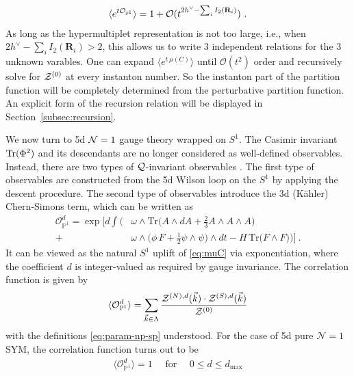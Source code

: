\documentclass[letterpaper, 11pt]{article}
\def\IP{\mathbb{P}}
\def\CN{{\cal N}}
\def\CO{{\cal O}}
\def\CQ{{\cal Q}}
\def\CZ{{\cal Z}}
\def\Tr{{\rm Tr}}
\begin{document}
\begin{align}
  \label{eq:donaldson-4d}
  \langle e^{t {\CO}_{\IP^1}}\rangle = 1 + \CO(t^{2h^\vee - \sum_i I_2(\mathbf{R}_i)})  \ . 
\end{align}
As long as the hypermultiplet representation is not too large, i.e., when $2h^\vee - \sum_i I_2(\mathbf{R}_i) > 2$, this allows us to write 3 independent relations for the 3 unknown varables. One can expand $\langle e^{t \, \mu(C)}\rangle$ until $\mathcal{O}(t^2)$ order and recursively solve for $\CZ^{(0)}$ at every instanton number. So the instanton part of the partition function will be completely determined from the perturbative partition function. An explicit form of the recursion relation will be displayed in Section~\ref{subsec:recursion}.

We now turn to 5d $\CN=1$ gauge theory wrapped on $S^1$. The Casimir invariant $\Tr (\Phi^2)$ and its descendants are no longer considered as well-defined observables. Instead, there are two types of $\CQ$-invariant observables \cite{Baulieu:1997nj}. The first type of observables are constructed from the 5d Wilson loop on the $S^1$ by applying the descent procedure. The second type of observables introduce the 3d (K\"ahler) Chern-Simons term, which can be written as \cite{Losev:1995cr,Baulieu:1997nj}
\begin{align} 
  \mathcal{O}_{\IP^1}^{d} = \exp\bigg[
    d\int \bigg( & \omega \wedge \text{Tr}\Big(A \wedge dA + \frac{2}{3}A\wedge A \wedge A \Big) \\ \nonumber
     + &\omega \wedge \Big( \phi \, F + \frac{1}{2}\psi \wedge \psi \Big)\wedge dt -H\, \text{Tr}\Big( F \wedge F \Big) \bigg)
     \bigg] \ .
\end{align}
It can be viewed as the natural $S^1$ uplift of \eqref{eq:muC} via exponentiation, where the coefficient $d$ is integer-valued as required by gauge invariance. The correlation function is given by
\begin{align}
  \label{eq:cor5d}
  \langle \mathcal{O}_{\IP^1}^{d}\rangle = \sum_{\vec{k} \in \Lambda}  \frac{\CZ^{(N),d}(\vec{k}) \cdot \CZ^{(S),d}(\vec{k})}{\CZ^{(0)}}
\end{align} 
with the definitions \eqref{eq:param-np-sp} understood. For the case of 5d pure $\mathcal{N}=1$ SYM, the correlation function turns out to be \cite{Nakajima:2005fg} 
\begin{align}
  \label{eq:cor5d-unity}
  \langle \mathcal{O}_{\IP^1}^{d}\rangle = 1 \quad \text{ for }\quad 0\leq d \leq d_\text{max}
\end{align}
\end{document}
